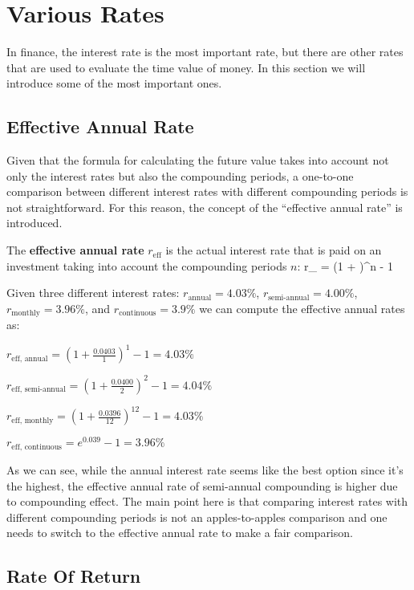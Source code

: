 \section{Various Rates}

In finance, the interest rate is the most important rate, but there are other rates that are used to evaluate the
time value of money. In this section we will introduce some of the most important ones.

\subsection{Effective Annual Rate}

Given that the formula for calculating the future value takes into account not only the interest rates but also the
compounding periods, a one-to-one comparison between different interest rates with different compounding periods is
not straightforward. For this reason, the concept of the ``effective annual rate'' is introduced.

The \textbf{effective annual rate} $r_{\text{eff}}$ is the actual interest rate that is paid on an investment taking
into account the compounding periods $n$:
\bse
r_{} = (1 + )^n - 1
\ese
\ed

\be
Given three different interest rates: $r_{\text{annual}} = 4.03\%$, $r_{\text{semi-annual}} = 4.00\%$,
$r_{\text{monthly}} = 3.96\%$, and $r_{\text{continuous}} = 3.9\%$ we can compute the effective annual rates as:
\bit
\item $r_{\text{eff, annual}} = \left(1 + \frac{0.0403}{1}\right)^1 - 1 = 4.03\%$
\item $r_{\text{eff, semi-annual}} = \left(1 + \frac{0.0400}{2}\right)^2 - 1 = 4.04\%$
\item $r_{\text{eff, monthly}} = \left(1 + \frac{0.0396}{12}\right)^{12} - 1 = 4.03\%$
\item $r_{\text{eff, continuous}} = e^{0.039} - 1 = 3.96\%$
\eit

As we can see, while the annual interest rate seems like the best option since it's the highest, the effective annual
rate of semi-annual compounding is higher due to compounding effect. The main point here is that comparing interest
rates with different compounding periods is not an apples-to-apples comparison and one needs to switch to the
effective annual rate to make a fair comparison.
\ee

\subsection{Rate Of Return}

